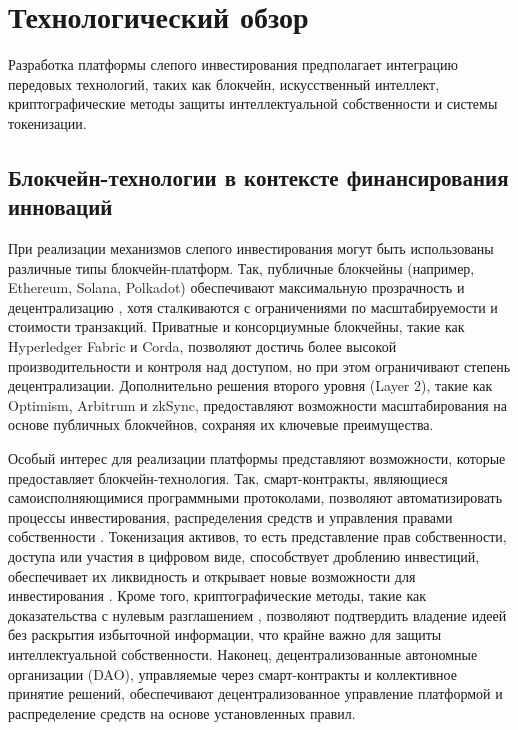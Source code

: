 \documentclass[
    candidate, %
    subf, %
    dotsinheaders=false,
]{disser}
\begin{document}
\section{Технологический обзор}

Разработка платформы слепого инвестирования предполагает интеграцию передовых технологий, таких как блокчейн, искусственный интеллект, криптографические методы защиты интеллектуальной собственности и системы токенизации.

\subsection{Блокчейн-технологии в контексте финансирования инноваций}

При реализации механизмов слепого инвестирования могут быть использованы различные типы блокчейн-платформ. Так, публичные блокчейны (например, Ethereum, Solana, Polkadot) обеспечивают максимальную прозрачность и децентрализацию \cite{antonopoulos2018ethereum}, хотя сталкиваются с ограничениями по масштабируемости и стоимости транзакций. Приватные и консорциумные блокчейны, такие как Hyperledger Fabric и Corda, позволяют достичь более высокой производительности и контроля над доступом, но при этом ограничивают степень децентрализации. Дополнительно решения второго уровня (Layer 2), такие как Optimism, Arbitrum и zkSync, предоставляют возможности масштабирования на основе публичных блокчейнов, сохраняя их ключевые преимущества.

Особый интерес для реализации платформы представляют возможности, которые предоставляет блокчейн-технология. Так, смарт-контракты, являющиеся самоисполняющимися программными протоколами, позволяют автоматизировать процессы инвестирования, распределения средств и управления правами собственности \cite{antonopoulos2018ethereum}. Токенизация активов, то есть представление прав собственности, доступа или участия в цифровом виде, способствует дроблению инвестиций, обеспечивает их ликвидность и открывает новые возможности для инвестирования \cite{dixon2018crypto}. Кроме того, криптографические методы, такие как доказательства с нулевым разглашением \cite{ben2014succinct}, позволяют подтвердить владение идеей без раскрытия избыточной информации, что крайне важно для защиты интеллектуальной собственности. Наконец, децентрализованные автономные организации (DAO), управляемые через смарт-контракты и коллективное принятие решений, обеспечивают децентрализованное управление платформой и распределение средств на основе установленных правил.
\end{document}
